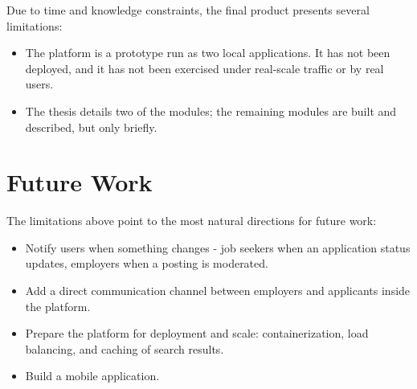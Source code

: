 Due to time and knowledge constraints, the final product presents several limitations:

\begin{itemize}
	\item The platform is a prototype run as two local applications. It has not been deployed, and it has not been exercised under real-scale traffic or by real users.
	\item The thesis details two of the modules; the remaining modules are built and described, but only briefly.
\end{itemize}

\section{Future Work}

The limitations above point to the most natural directions for future work:

\begin{itemize}
	\item Notify users when something changes - job seekers when an application status updates, employers when a posting is moderated.
	\item Add a direct communication channel between employers and applicants inside the platform.
	\item Prepare the platform for deployment and scale: containerization, load balancing, and caching of search results.
	\item Build a mobile application.
\end{itemize}